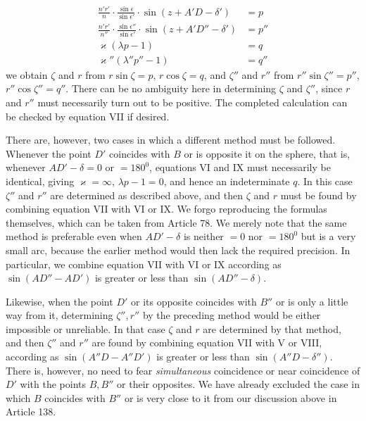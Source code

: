 \[
\begin{aligned}
\frac{n'r'}{n}\cdot\frac{\sin\epsilon}{\sin\epsilon'}\cdot\sin(z+A'D-\delta')&=p\\[.5ex]
\frac{n'r'}{n''}\cdot\frac{\sin\epsilon''}{\sin\epsilon'}\cdot\sin(z+A'D''-\delta')&=p''\\[.5ex]
\varkappa(\lambda p-1)&=q\\[.5ex]
\varkappa''(\lambda''p''-1)&=q''
\end{aligned}
\]
we obtain $\zeta$ and $r$ from $r\sin\zeta=p$, $r\cos\zeta=q$, and $\zeta''$ and $r''$ from $r''\sin\zeta''=p''$, $r''\cos\zeta''=q''$. There can be no ambiguity here in determining $\zeta$ and $\zeta''$, since $r$ and $r''$ must necessarily turn out to be positive. The completed calculation can be checked by equation VII if desired.

There are, however, two cases in which a different method must be followed. Whenever the point $D'$ coincides with $B$ or is opposite it on the sphere, that is, whenever $AD'-\delta=0$ or $=180^0$, equations VI and IX must necessarily be identical, giving $\varkappa=\infty$, $\lambda p-1=0$, and hence an indeterminate $q$. In this case $\zeta''$ and $r''$ are determined as described above, and then $\zeta$ and $r$ must be found by combining equation VII with VI or IX. We forgo reproducing the formulas themselves, which can be taken from Article 78. We merely note that the same method is preferable even when $AD'-\delta$ is neither $=0$ nor $=180^0$ but is a very small arc, because the earlier method would then lack the required precision. In particular, we combine equation VII with VI or IX according as $\sin(AD''-AD')$ is greater or less than $\sin(AD''-\delta)$.

Likewise, when the point $D'$ or its opposite coincides with $B''$ or is only a little way from it, determining $\zeta'',r''$ by the preceding method would be either impossible or unreliable. In that case $\zeta$ and $r$ are determined by that method, and then $\zeta''$ and $r''$ are found by combining equation VII with V or VIII, according as $\sin(A''D-A''D')$ is greater or less than $\sin(A''D-\delta'')$. There is, however, no need to fear \emph{simultaneous} coincidence or near coincidence of $D'$ with the points $B,B''$ or their opposites. We have already excluded the case in which $B$ coincides with $B''$ or is very close to it from our discussion above in Article 138.
